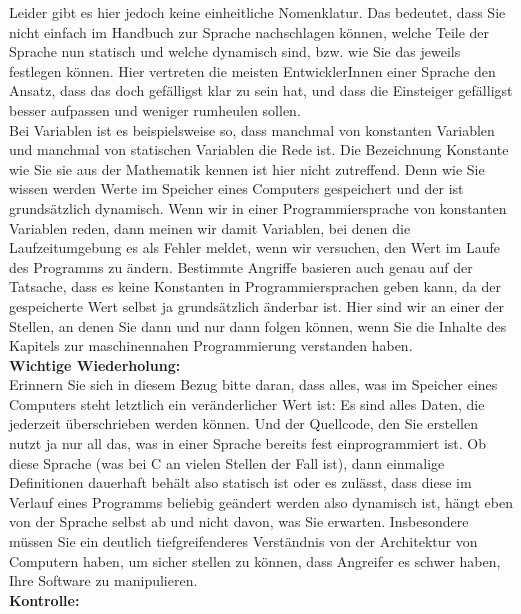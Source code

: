 Leider gibt es hier jedoch keine einheitliche Nomenklatur. Das bedeutet, dass Sie nicht einfach im Handbuch zur Sprache nachschlagen können, welche Teile der Sprache nun statisch und welche dynamisch sind, bzw. wie Sie das jeweils festlegen können. Hier vertreten die meisten EntwicklerInnen einer Sprache den Ansatz, dass das doch gefälligst klar zu sein hat, und dass die Einsteiger gefälligst besser aufpassen und weniger rumheulen sollen.\\

Bei Variablen ist es beispielsweise so, dass manchmal von konstanten Variablen und manchmal von statischen Variablen die Rede ist. Die Bezeichnung Konstante wie Sie sie aus der Mathematik kennen ist hier nicht zutreffend. Denn wie Sie wissen werden Werte im Speicher eines Computers gespeichert und der ist grundsätzlich dynamisch. Wenn wir in einer Programmiersprache von konstanten Variablen reden, dann meinen wir damit Variablen, bei denen die Laufzeitumgebung es als Fehler meldet, wenn wir versuchen, den Wert im Laufe des Programms zu ändern. Bestimmte Angriffe basieren auch genau auf der Tatsache, dass es keine Konstanten in Programmiersprachen geben kann, da der gespeicherte Wert selbst ja grundsätzlich änderbar ist. Hier sind wir an einer der Stellen, an denen Sie dann und nur dann folgen können, wenn Sie die Inhalte des Kapitels zur maschinennahen Programmierung verstanden haben.\\

\textbf{Wichtige Wiederholung:}\\

Erinnern Sie sich in diesem Bezug bitte daran, dass alles, was im Speicher eines Computers steht letztlich ein veränderlicher Wert ist: Es sind alles Daten, die jederzeit überschrieben werden können. Und der Quellcode, den Sie erstellen nutzt ja nur all das, was in einer Sprache bereits fest einprogrammiert ist. Ob diese Sprache (was bei C an vielen Stellen der Fall ist), dann einmalige Definitionen dauerhaft behält also statisch ist oder es zulässt, dass diese im Verlauf eines Programms beliebig geändert werden also dynamisch ist, hängt eben von der Sprache selbst ab und nicht davon, was Sie erwarten. Insbesondere müssen Sie ein deutlich tiefgreifenderes Verständnis von der Architektur von Computern haben, um sicher stellen zu können, dass Angreifer es schwer haben, Ihre Software zu manipulieren.\\

\textbf{Kontrolle:}\\

